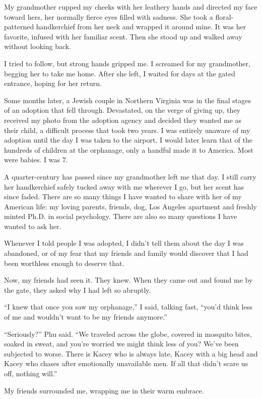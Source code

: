 My grandmother cupped my cheeks with her leathery hands and directed my
face toward hers, her normally fierce eyes filled with sadness. She took
a floral-patterned handkerchief from her neck and wrapped it around
mine. It was her favorite, infused with her familiar scent. Then she
stood up and walked away without looking back.

I tried to follow, but strong hands gripped me. I screamed for my
grandmother, begging her to take me home. After she left, I waited for
days at the gated entrance, hoping for her return.

Some months later, a Jewish couple in Northern Virginia was in the final
stages of an adoption that fell through. Devastated, on the verge of
giving up, they received my photo from the adoption agency and decided
they wanted me as their child, a difficult process that took two years.
I was entirely unaware of my adoption until the day I was taken to the
airport. I would later learn that of the hundreds of children at the
orphanage, only a handful made it to America. Most were babies. I was 7.

A quarter-century has passed since my grandmother left me that day. I
still carry her handkerchief safely tucked away with me wherever I go,
but her scent has since faded. There are so many things I have wanted to
share with her of my American life: my loving parents, friends, dog, Los
Angeles apartment and freshly minted Ph.D. in social psychology. There
are also so many questions I have wanted to ask her.

Whenever I told people I was adopted, I didn't tell them about the day I
was abandoned, or of my fear that my friends and family would discover
that I had been worthless enough to deserve that.

Now, my friends had seen it. They knew. When they came out and found me
by the gate, they asked why I had left so abruptly.

``I knew that once you saw my orphanage,'' I said, talking fast, ``you'd
think less of me and wouldn't want to be my friends anymore.''

``Seriously?'' Phu said. ``We traveled across the globe, covered in
mosquito bites, soaked in sweat, and you're worried we might think less
of you? We've been subjected to worse. There is Kacey who is always
late, Kacey with a big head and Kacey who chases after emotionally
unavailable men. If all that didn't scare us off, nothing will.''

My friends surrounded me, wrapping me in their warm embrace.

